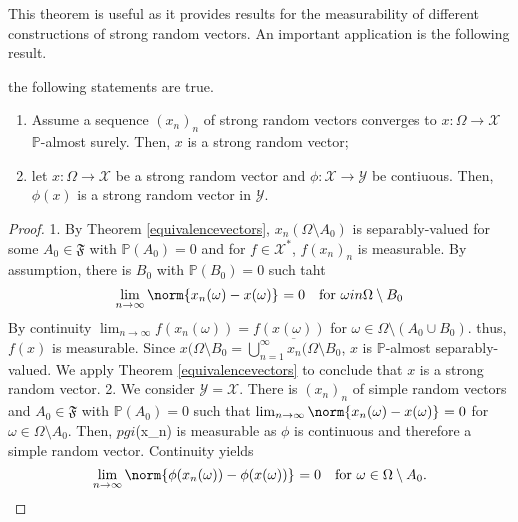 This theorem is useful as it provides results for the measurability of different constructions of strong random vectors. An important application is the following result. 

\begin{corl}[]
  \label{functionsofvectors}
    the following statements are true.
    \begin{enumerate}[1)]
      \item Assume a sequence \( \left(x_n\right)_n \) of strong random vectors converges to \( x: \Omega \to \mathcal{X} \) \( \mathbb{P} \)-almost surely. Then, \( x \) is a strong random vector;
      \item let \( x: \Omega \to \mathcal{X} \) be a strong random vector and \( \phi: \mathcal{X} \to \mathcal{Y} \) be contiuous. Then, \( \phi (x) \) is a strong random vector in \( \mathcal{Y} \).
    \end{enumerate}
    
\end{corl}

\begin{proof}
  1. By Theorem \ref{equivalencevectors}, \( x_n(\Omega \setminus A_0) \) is separably-valued for some \( A_0 \in \mathfrak{F} \) with \( \mathbb{P}(A_0)=0 \) and for \( f \in \mathcal{X}^{*} \), \( f(x_n)_n \) is measurable. By assumption, there is \( B_0 \) with \( \mathbb{P}(B_0)=0 \) such taht
  \[ \lim_{n \to \infty} \norm{x_n(\omega )-x(\omega )}_{}=0 \quad \text{for \( \omega in \Omega  \setminus B_0 \)} \] 
  By continuity \( \lim_{n \to \infty} f(x_n(\omega ))=f(x(\omega )) \) for \( \omega \in \Omega  \setminus \left(A_0 \cup B_0\right) \). thus, \( f(x) \) is measurable. Since \( x(\Omega \setminus B_0= \overline{\bigcup_{n=1}^{\infty } x_n(\Omega \setminus B_0} \), \( x \) is \( \mathbb{P} \)-almost separably-valued. We apply Theorem \ref{equivalencevectors} to conclude that \( x  \) is a strong random vector.
  2. We consider \( \mathcal{Y}=\mathcal{X} \). There is \( (x_n)_n \) of simple random vectors and \( A_0 \in \mathfrak{F}\) with \( \mathbb{P}(A_0)=0 \) such that \( \lim_{n \to \infty} \norm{x_n(\omega )-x(\omega )}_{}=0 \) for \( \omega  \in \Omega  \setminus A_0 \). Then, \( pgi \)(x_n) is measurable as \( \phi   \) is continuous and therefore a simple random vector. Continuity yields 
        \[ \lim_{n \to \infty} \norm{\phi(x_n(\omega ))-\phi(x(\omega ))}_{}=0 \quad \text{for \( \omega \in \Omega \setminus A_0 \).} \]

\end{proof}



